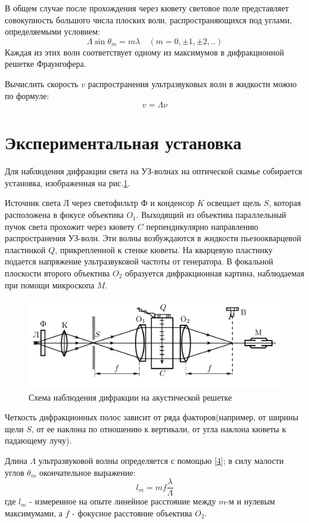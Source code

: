 \documentclass[a4paper,12pt]{article}
\begin{document}
В общем случае после прохождения через кювету световое поле представляет совокупность большого числа плоских волн, распространяющихся под углами, определяемыми условием:
\begin{equation}
    \Lambda\sin{\theta_m} = m\lambda \quad (m=0,\pm1,\pm2,..)
\label{4}
\end{equation}
Каждая из этих волн соответствует одному из максимумов в дифракционной решетке Фраунгофера.

Вычислить скорость $v$ распространения ультразвуковых волн в жидкости можно по формуле:
\begin{equation}
    v=\Lambda \nu
\end{equation}

\section{Экспериментальная установка}
Для наблюдения дифракции света на УЗ-волнах на оптической скамье собирается установка, изображенная на рис.\ref{img2}.

Источник света $\text{Л}$ через светофильтр $\text{Ф}$ и конденсор $K$ освещает щель $S$, которая расположена в фокусе объектива $O_1$. Выходящий из объектива параллельный пучок света прохожит через кювету $C$ перпендикулярно направлению распространения УЗ-волн. Эти волны возбуждаются в жидкости пьезоокварцевой пластинкой $Q$, прикрепленной к стенке кюветы. На кварцевую пластинку подается напряжение ультразвуковой частоты от генератора. В фокальной плоскости второго объектива $O_2$ образуется дифракционная картина, наблюдаемая при помощи микроскопа $M$.

\begin{figure}[h]
\centering
\includegraphics[width=0.8\linewidth]{img2.png}
\caption{Схема наблюдения дифракции на акустической решетке}
\label{img2}
\end{figure}

Четкость дифракционных полос зависит от ряда факторов(например, от ширины щели $S$, от ее наклона по отношению к вертикали, от угла наклона кюветы к падающему лучу).

Длина $\Lambda$ ультразвуковой волны определяется с помощью \ref{4}; в силу малости углов $\theta_m$ окончательное выражение:
\begin{equation}
    l_m=mf\frac{\lambda}{\Lambda}
\end{equation}
где $l_m$ - измеренное на опыте линейное расстояние между $m$-м и нулевым максимумами, а $f$ - фокусное расстояние объектива $O_2$.
\end{document}
